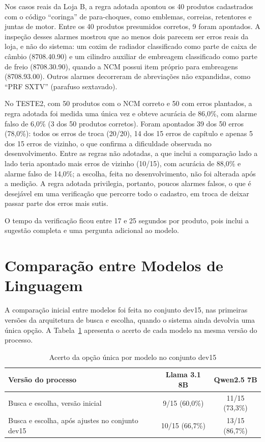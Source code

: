 Nos casos reais da Loja B, a regra adotada apontou os 40 produtos cadastrados com o código ``coringa'' de para-choques, como emblemas, correias, retentores e juntas de motor. Entre os 40 produtos presumidos corretos, 9 foram apontados. A inspeção desses alarmes mostrou que ao menos dois parecem ser erros reais da loja, e não do sistema: um coxim de radiador classificado como parte de caixa de câmbio (8708.40.90) e um cilindro auxiliar de embreagem classificado como parte de freio (8708.30.90), quando a NCM possui item próprio para embreagens (8708.93.00). Outros alarmes decorreram de abreviações não expandidas, como ``PRF SXTV'' (parafuso sextavado).

No TESTE2, com 50 produtos com o NCM correto e 50 com erros plantados, a regra adotada foi medida uma única vez e obteve acurácia de 86,0\%, com alarme falso de 6,0\% (3 dos 50 produtos corretos). Foram apontados 39 dos 50 erros (78,0\%): todos os erros de troca (20/20), 14 dos 15 erros de capítulo e apenas 5 dos 15 erros de vizinho, o que confirma a dificuldade observada no desenvolvimento. Entre as regras não adotadas, a que inclui a comparação lado a lado teria apontado mais erros de vizinho (10/15), com acurácia de 88,0\% e alarme falso de 14,0\%; a escolha, feita no desenvolvimento, não foi alterada após a medição. A regra adotada privilegia, portanto, poucos alarmes falsos, o que é desejável em uma verificação que percorre todo o cadastro, em troca de deixar passar parte dos erros mais sutis.

O tempo da verificação ficou entre 17 e 25 segundos por produto, pois inclui a sugestão completa e uma pergunta adicional ao modelo.

\section{Comparação entre Modelos de Linguagem}

A comparação inicial entre modelos foi feita no conjunto dev15, nas primeiras versões da arquitetura de busca e escolha, quando o sistema ainda devolvia uma única opção. A Tabela~\ref{tab:modelos} apresenta o acerto de cada modelo na mesma versão do processo.

\begin{table}[H]
\centering
\caption{Acerto da opção única por modelo no conjunto dev15}
\label{tab:modelos}
\begin{tabular}{p{7.5cm} c c}
\hline
\textbf{Versão do processo} & \textbf{Llama 3.1 8B} & \textbf{Qwen2.5 7B} \\
\hline
Busca e escolha, versão inicial & 9/15 (60,0\%) & 11/15 (73,3\%) \\
Busca e escolha, após ajustes no conjunto dev15 & 10/15 (66,7\%) & 13/15 (86,7\%) \\
\hline
\end{tabular}
\end{table}

